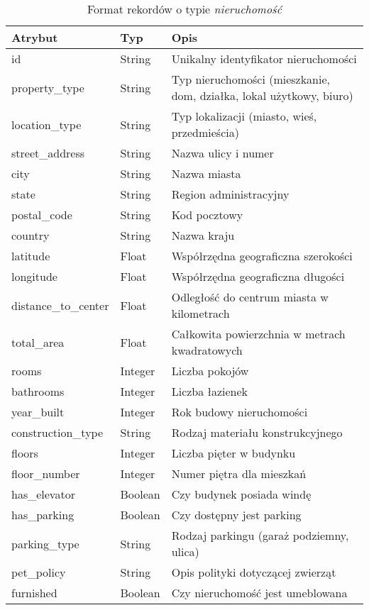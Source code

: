 \begin{table}[H]
    \caption{Format rekordów o typie \textit{nieruchomość}}
    \centering
    \begin{tabular}{|l|l|l|}
    \hline
    \textbf{Atrybut} & \textbf{Typ} & \textbf{Opis} \\
    \hline
    id & String & Unikalny identyfikator nieruchomości \\
    property\_type & String & Typ nieruchomości (mieszkanie, dom, działka, lokal użytkowy, biuro) \\
    location\_type & String & Typ lokalizacji (miasto, wieś, przedmieścia) \\
    street\_address & String & Nazwa ulicy i numer \\
    city & String & Nazwa miasta \\
    state & String & Region administracyjny \\
    postal\_code & String & Kod pocztowy \\
    country & String & Nazwa kraju \\
    latitude & Float & Współrzędna geograficzna szerokości \\
    longitude & Float & Współrzędna geograficzna długości \\
    distance\_to\_center & Float & Odległość do centrum miasta w kilometrach \\
    total\_area & Float & Całkowita powierzchnia w metrach kwadratowych \\
    rooms & Integer & Liczba pokojów  \\
    bathrooms & Integer & Liczba łazienek \\
    year\_built & Integer & Rok budowy nieruchomości \\
    construction\_type & String & Rodzaj materiału konstrukcyjnego \\
    floors & Integer & Liczba pięter w budynku \\
    floor\_number & Integer & Numer piętra dla mieszkań \\
    has\_elevator & Boolean & Czy budynek posiada windę \\
    has\_parking & Boolean & Czy dostępny jest parking \\
    parking\_type & String & Rodzaj parkingu (garaż podziemny, ulica) \\ 
    pet\_policy & String & Opis polityki dotyczącej zwierząt \\
    furnished & Boolean & Czy nieruchomość jest umeblowana \\

\end{tabular}
\end{table}
